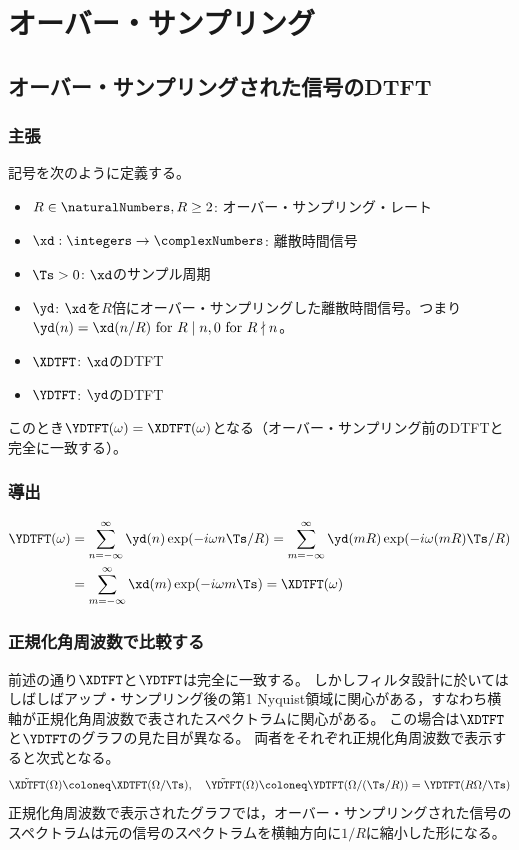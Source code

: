 \chapter{オーバー・サンプリング}
    \section{オーバー・サンプリングされた信号のDTFT}
        \label{オーバー・サンプリングされた信号の DTFT}
        \subsection{主張}
            記号を次のように定義する。
            \begin{itemize}
                \item $R\in\naturalNumbers,R\geq 2$: オーバー・サンプリング・レート
                \item $\xd:\integers\to\complexNumbers$: 離散時間信号
                \item $\Ts>0$: $\xd$のサンプル周期
                \item $\yd$: $\xd$を$R$倍にオーバー・サンプリングした離散時間信号。つまり$\yd(n) = \xd(n/R)\text{ for }R\mid n,0\text{ for }R\nmid n$。
                \item $\XDTFT$: $\xd$のDTFT
                \item $\YDTFT$: $\yd$のDTFT
            \end{itemize}
            このとき$\YDTFT(\omega) = \XDTFT(\omega)$となる（オーバー・サンプリング前のDTFTと完全に一致する）。
        \subsection{導出}
            \begin{align*}
                \YDTFT(\omega) &= \sum_{n=-\infty}^\infty \yd(n)\exp(-i\omega n\Ts/R) = \sum_{m=-\infty}^\infty \yd(mR)\exp(-i\omega (mR)\Ts/R) \\
                &= \sum_{m=-\infty}^\infty \xd(m)\exp(-i\omega m\Ts) = \XDTFT(\omega)
            \end{align*}
        \subsection{正規化角周波数で比較する}
            前述の通り$\XDTFT$と$\YDTFT$は完全に一致する。
            しかしフィルタ設計に於いてはしばしばアップ・サンプリング後の第1 Nyquist領域に関心がある，すなわち横軸が正規化角周波数で表されたスペクトラムに関心がある。
            この場合は$\XDTFT$と$\YDTFT$のグラフの見た目が異なる。
            両者をそれぞれ正規化角周波数で表示すると次式となる。
            \[ \tilde{\XDTFT}(\Omega) \coloneq \XDTFT(\Omega/\Ts),\quad \tilde{\YDTFT}(\Omega) \coloneq \YDTFT(\Omega/(\Ts/R)) = \YDTFT(R\Omega/\Ts) \]
            正規化角周波数で表示されたグラフでは，オーバー・サンプリングされた信号のスペクトラムは元の信号のスペクトラムを横軸方向に$1/R$に縮小した形になる。
